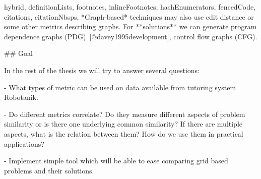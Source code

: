 \documentclass[
  digital, %
  table,   %
  lof,     %
  lot,     %
]{fithesis3}
\begin{document}
\begin{markdown*}{%
  hybrid,
  definitionLists,
  footnotes,
  inlineFootnotes,
  hashEnumerators,
  fencedCode,
  citations,
  citationNbsps,
}
*Graph-based* techniques may also use edit distance or some other metrics describing graphs. For **solutions** we can generate program dependence graphs (PDG)~[@davey1995development], control flow graphs (CFG).

## Goal

In the rest of the thesis we will try to answer several questions:

- What types of metric can be used on data available from tutoring system Robotanik.

- Do different metrics correlate? Do they measure different aspects of problem similarity or is there one underlying common similarity? If there are multiple aspects, what is the relation between them? How do we use them in practical applications?

- Implement simple tool which will be able to ease comparing grid based problems and their solutions.

%
%

\iffalse %

# Robotanik

In this chapter we will talk more about things that are specific to Robotanik and data used in our analysis.

Most of the experiments were executed on data collected from programming environment Robotanik available at [tutor.fi.muni.cz](http://tutor.fi.muni.cz/). Robotanik is programming environment with 78 handcrafted problems for student to solve. Goal of the student is to write program for robot to traverse board and collect all flowers. Each problem has board filled with tiles of stones, colored tiles (green, red, brown) and flowers.

## Data

**Problem statements**

**Solutions**

**Performance data**

## Chosen metrics

In this thesis we are consider only some metrics. We will describe them in detail in this chapter.

### Problem statement

### Solutions

### Performance data


%
%

# Tool

## Tool capabilities

## Chosen metrics

## Evaluation

### Compare metrics

### Collecting crowd-truth

## Visualisations

\fi %

\end{markdown*}
\end{document}
